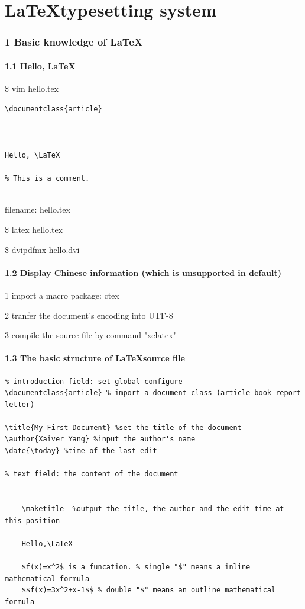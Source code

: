 \part*{\LaTeX\space typesetting system}

\section*{1 Basic knowledge of \LaTeX}

\subsection*{1.1 Hello, \LaTeX}

\$ vim hello.tex

\begin{lstlisting}
\documentclass{article}



Hello, \LaTeX

% This is a comment.


\end{lstlisting}

filename: hello.tex

\$ latex hello.tex

\$ dvipdfmx hello.dvi

\subsection*{1.2 Display Chinese information (which is unsupported in default)}

1 import a macro package: ctex

2 tranfer the document's encoding into UTF-8

3 compile the source file by command "xelatex"

\subsection*{1.3 The basic structure of \LaTeX\space source file}

\begin{lstlisting}
% introduction field: set global configure
\documentclass{article} % import a document class (article book report letter)

\title{My First Document} %set the title of the document
\author{Xaiver Yang} %input the author's name
\date{\today} %time of the last edit

% text field: the content of the document

	
    \maketitle  %output the title, the author and the edit time at this position
	
    Hello,\LaTeX

	$f(x)=x^2$ is a funcation. % single "$" means a inline mathematical formula
	$$f(x)=3x^2+x-1$$ % double "$" means an outline mathematical formula

\end{lstlisting}

